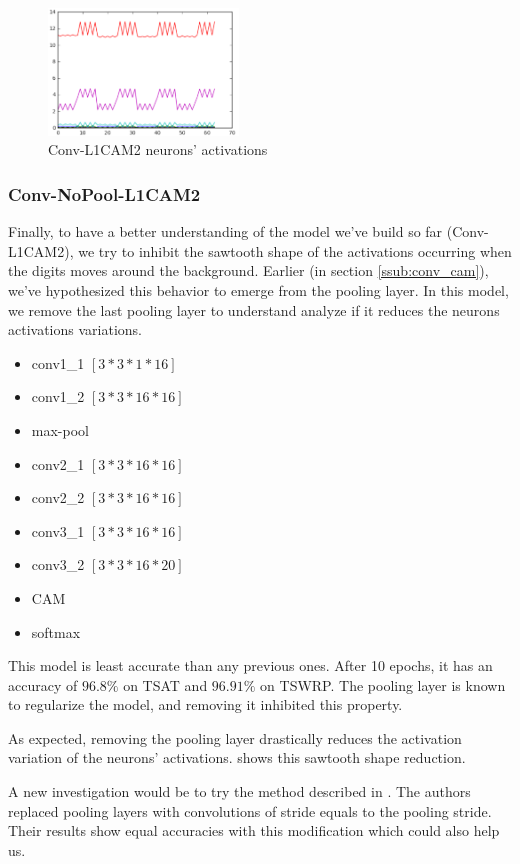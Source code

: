 				\begin{figure}[h]
					\centering
					\includegraphics[width=0.45\textwidth]{images/multiPosGraphConvCAM2_L1}
					\caption{Conv-L1CAM2 neurons' activations}
					\label{fig:multipose_graph_CAM2_L1}
				\end{figure}


			\subsubsection{Conv-NoPool-L1CAM2}
			\label{ssub:conv_nopool_l1cam}
				Finally, to have a better understanding of the model we've build so far (Conv-L1CAM2), we try to inhibit the sawtooth shape of the activations occurring when the digits moves around the background. Earlier (in section \ref{ssub:conv_cam}), we've hypothesized this behavior to emerge from the pooling layer. In this model, we remove the last pooling layer to understand analyze if it reduces the neurons activations variations.

				\begin{itemize}
					\setlength\itemsep{-0.4em}
					\item conv1\_1 $[3*3*1*16]$
					\item conv1\_2 $[3*3*16*16]$
					\item max-pool
					\item conv2\_1 $[3*3*16*16]$
					\item conv2\_2 $[3*3*16*16]$
					\item conv3\_1 $[3*3*16*16]$
					\item conv3\_2 $[3*3*16*20]$
					\item CAM
					\item softmax
				\end{itemize}

				This model is least accurate than any previous ones. After 10 epochs, it has an accuracy of $96.8\%$ on TSAT and $96.91\%$ on TSWRP. The pooling layer is known to regularize the model, and removing it inhibited this property.

				\begin{mdframed}[backgroundcolor = gray!30]
					As expected, removing the pooling layer drastically reduces the activation variation of the neurons' activations.  shows this sawtooth shape reduction. 

					A new investigation would be to try the method described in \cite{springenberg2014striving}. The authors replaced  pooling layers with convolutions of stride equals to the pooling stride. Their results show equal accuracies with this modification which could also help us.
				\end{mdframed}

